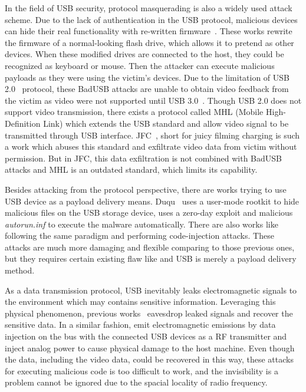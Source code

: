 In the field of USB security, protocol masquerading is also a widely used
attack scheme. Due to the lack of authentication in the USB protocol, malicious
devices can hide their real functionality with re-written
firmware~\cite{rubber,badusb,rubberducky2020,usbbypassing,iseeyou,usbdriver}.
These works rewrite the firmware of a normal-looking flash drive, which allows
it to pretend as other devices. When these modified drives are connected to the
host, they could be recognized as keyboard or mouse. Then the attacker can
execute malicious payloads as they were using the victim's devices. Due to the
limitation of USB 2.0~\cite{usb20} protocol, these BadUSB
attacks are unable to obtain video feedback from the victim
as video were not supported until USB 3.0~\cite{usb30}. Though USB 2.0 does not
support video transmission, there exists a protocol called MHL (Mobile
High-Definition Link) which extends the USB standard and allow video signal to
be transmitted through USB interface. JFC~\cite{JFC}, short for juicy filming
charging is such a work which abuses this standard and exfiltrate video data
from victim without permission. But in JFC, this data exfiltration is not
combined with BadUSB attacks and MHL is an outdated standard, which limits its
capability.

Besides attacking from the protocol perspective, there are works trying to use
USB device as a payload delivery means. Duqu~\cite{duqu} uses a user-mode
rootkit to hide malicious files on the USB storage device, \cite{flame} uses a
zero-day exploit and malicious \textit{autorun.inf} to execute the malware
automatically. There are also works like \cite{brain, stuxnet, conficker}
following the same paradigm and performing code-injection attacks. These
attacks are much more damaging and flexible comparing to those previous ones,
but they requires certain existing flaw like \cite{zero-day} and USB is merely
a payload delivery method.

As a data transmission protocol, USB inevitably leaks electromagnetic signals
to the environment which may contains sensitive information. Leveraging this
physical phenomenon, previous works~\cite{smartphone,
poweremi,revealing,su2017usb,usbgpslocator,bates2014leveraging,badusbhub,usbfinger,side,usbdriver}
eavesdrop leaked signals and recover the sensitive data. In a similar fashion,
\cite{usbee,turnip} emit electromagnetic emissions by data injection on the bus
with the connected USB devices as a RF transmitter and \cite{usbkiller,
cable} inject analog
power to cause physical damage to the host machine. Even though the data,
including the video data, could be recovered in this way, these attacks for
executing malicious code is too difficult to work, and the invisibility is a
problem cannot be ignored due to the spacial locality of radio frequency.

